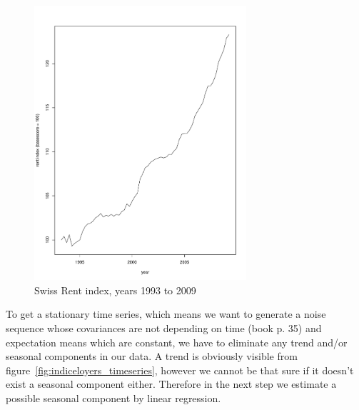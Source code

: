\documentclass[11pt,a4paper]{article}
\begin{document}
\begin{figure}[!htb]
\centering
\includegraphics[angle=0,
width=0.7\textwidth]{indiceloyers_train}
\caption{Swiss Rent index, years 1993 to 2009\label{fig:indiceloyers_train}}
\end{figure}

To get a stationary time series, which means we want to generate a noise sequence whose covariances are not depending on time (book p. 35) and expectation means which are constant, we have to eliminate any trend and/or seasonal components in our data. A trend is obviously visible from figure~\ref{fig:indiceloyers_timeseries}, however we cannot be that sure if it doesn't exist a seasonal component either. Therefore in the next step we estimate a possible seasonal component by linear regression. 
\end{document}
